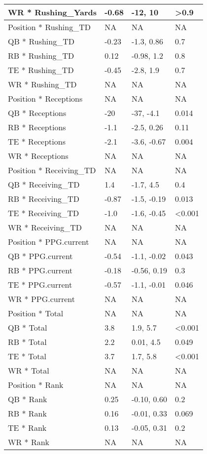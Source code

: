 \begin{tabular}{l|l|l|l}
\hline
WR * Rushing\_Yards & -0.68 & -12, 10 & >0.9\\
\hline
Position * Rushing\_TD & NA & NA & NA\\
\hline
QB * Rushing\_TD & -0.23 & -1.3, 0.86 & 0.7\\
\hline
RB * Rushing\_TD & 0.12 & -0.98, 1.2 & 0.8\\
\hline
TE * Rushing\_TD & -0.45 & -2.8, 1.9 & 0.7\\
\hline
WR * Rushing\_TD & NA & NA & NA\\
\hline
Position * Receptions & NA & NA & NA\\
\hline
QB * Receptions & -20 & -37, -4.1 & 0.014\\
\hline
RB * Receptions & -1.1 & -2.5, 0.26 & 0.11\\
\hline
TE * Receptions & -2.1 & -3.6, -0.67 & 0.004\\
\hline
WR * Receptions & NA & NA & NA\\
\hline
Position * Receiving\_TD & NA & NA & NA\\
\hline
QB * Receiving\_TD & 1.4 & -1.7, 4.5 & 0.4\\
\hline
RB * Receiving\_TD & -0.87 & -1.5, -0.19 & 0.013\\
\hline
TE * Receiving\_TD & -1.0 & -1.6, -0.45 & <0.001\\
\hline
WR * Receiving\_TD & NA & NA & NA\\
\hline
Position * PPG.current & NA & NA & NA\\
\hline
QB * PPG.current & -0.54 & -1.1, -0.02 & 0.043\\
\hline
RB * PPG.current & -0.18 & -0.56, 0.19 & 0.3\\
\hline
TE * PPG.current & -0.57 & -1.1, -0.01 & 0.046\\
\hline
WR * PPG.current & NA & NA & NA\\
\hline
Position * Total & NA & NA & NA\\
\hline
QB * Total & 3.8 & 1.9, 5.7 & <0.001\\
\hline
RB * Total & 2.2 & 0.01, 4.5 & 0.049\\
\hline
TE * Total & 3.7 & 1.7, 5.8 & <0.001\\
\hline
WR * Total & NA & NA & NA\\
\hline
Position * Rank & NA & NA & NA\\
\hline
QB * Rank & 0.25 & -0.10, 0.60 & 0.2\\
\hline
RB * Rank & 0.16 & -0.01, 0.33 & 0.069\\
\hline
TE * Rank & 0.13 & -0.05, 0.31 & 0.2\\
\hline
WR * Rank & NA & NA & NA\\
\hline
\end{tabular}

